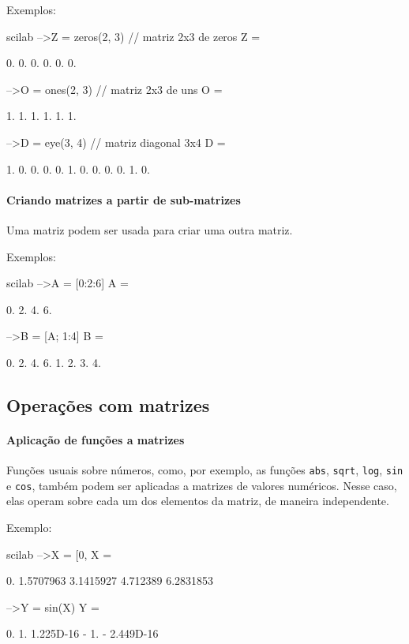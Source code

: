 \documentclass[11pt,fleqn]{practice}
\begin{document}
Exemplos:
\begin{lst}{scilab}
-->Z = zeros(2, 3)    // matriz 2x3 de zeros
 Z  =
 
    0.    0.    0.  
    0.    0.    0.  
 
-->O = ones(2, 3)    // matriz 2x3 de uns
 O  =
 
    1.    1.    1.  
    1.    1.    1.  
 
-->D = eye(3, 4)    // matriz diagonal 3x4
 D  =
 
    1.    0.    0.    0.  
    0.    1.    0.    0.  
    0.    0.    1.    0.
\end{lst}

\paragraph{Criando matrizes a partir de sub-matrizes}

Uma matriz podem ser usada para criar uma outra matriz.

Exemplos:
\begin{lst}{scilab}
-->A = [0:2:6]
 A  =
 
    0.    2.    4.    6.  
 
-->B = [A; 1:4]
 B  =
 
    0.    2.    4.    6.  
    1.    2.    3.    4.
\end{lst}


\subsection{Operações com matrizes}

\paragraph{Aplicação de funções a matrizes}

Funções usuais sobre números, como, por exemplo, as funções
\texttt{abs}, \texttt{sqrt}, \texttt{log}, \texttt{sin} e \texttt{cos},
também podem ser aplicadas a matrizes de valores numéricos. Nesse caso,
elas operam sobre cada um dos elementos da matriz, de maneira
independente.

Exemplo:
\begin{lst}{scilab}
-->X = [0, %
 X  =
 
    0.    1.5707963    3.1415927    4.712389    6.2831853  
 
-->Y = sin(X)
 Y  =
 
    0.    1.    1.225D-16  - 1.  - 2.449D-16  
\end{lst}
\end{document}
